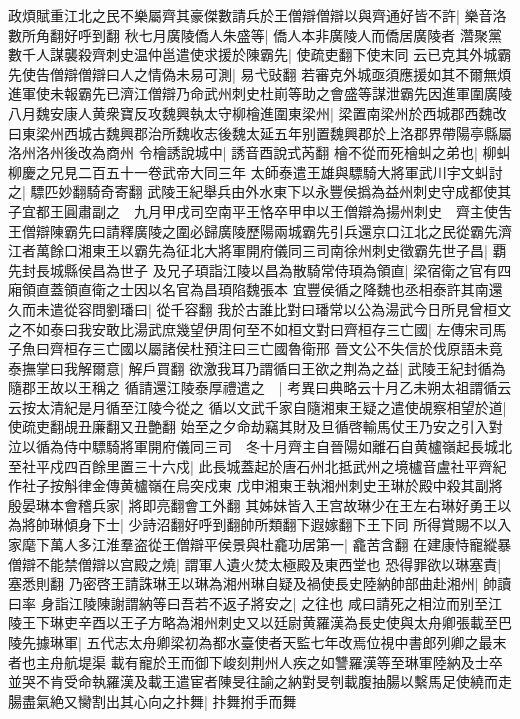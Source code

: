 政煩賦重江北之民不樂屬齊其豪傑數請兵於王僧辯僧辯以與齊通好皆不許|{
	樂音洛數所角翻好呼到翻}
秋七月廣陵僑人朱盛等|{
	僑人本非廣陵人而僑居廣陵者}
濳聚黨數千人謀襲殺齊刺史温仲邕遣使求援於陳霸先|{
	使疏吏翻下使末同}
云已克其外城霸先使告僧辯僧辯曰人之情偽未易可測|{
	易弋䜴翻}
若審克外城亟須應援如其不爾無煩進軍使未報霸先已濟江僧辯乃命武州刺史杜崱等助之會盛等謀泄霸先因進軍圍廣陵　八月魏安康人黄衆寶反攻魏興執太守柳檜進圍東梁州|{
	梁置南梁州於西城郡西魏改曰東梁州西城古魏興郡治所魏收志後魏太延五年别置魏興郡於上洛郡界帶陽亭縣屬洛州洛州後改為商州}
令檜誘說城中|{
	誘音酉說式芮翻}
檜不從而死檜虯之弟也|{
	柳虯柳慶之兄見二百五十一卷武帝大同三年}
太師泰遣王雄與驃騎大將軍武川宇文虯討之|{
	驃匹妙翻騎奇寄翻}
武陵王紀舉兵由外水東下以永豐侯撝為益州刺史守成都使其子宜都王圓肅副之　九月甲戌司空南平王恪卒甲申以王僧辯為揚州刺史　齊主使吿王僧辯陳霸先曰請釋廣陵之圍必歸廣陵歷陽兩城霸先引兵還京口江北之民從霸先濟江者萬餘口湘東王以霸先為征北大將軍開府儀同三司南徐州刺史徵霸先世子昌|{
	覇先封長城縣侯昌為世子}
及兄子頊詣江陵以昌為散騎常侍頊為領直|{
	梁宿衛之官有四廂領直蓋領直衛之士因以名官為昌頊陷魏張本}
宜豐侯循之降魏也丞相泰許其南還久而未遣從容問劉璠曰|{
	從千容翻}
我於古誰比對曰璠常以公為湯武今日所見曾桓文之不如泰曰我安敢比湯武庶幾望伊周何至不如桓文對曰齊桓存三亡國|{
	左傳宋司馬子魚曰齊桓存三亡國以屬諸侯杜預注曰三亡國魯衛邢}
晉文公不失信於伐原語未竟泰撫掌曰我解爾意|{
	解戶買翻}
欲激我耳乃謂循曰王欲之荆為之益|{
	武陵王紀封循為隨郡王故以王稱之}
循請還江陵泰厚禮遣之　|{
	考異曰典略云十月乙未朔太祖謂循云云按太清紀是月循至江陵今從之}
循以文武千家自隨湘東王疑之遣使覘察相望於道|{
	使疏吏翻覘丑廉翻又丑艶翻}
始至之夕命劫竊其財及旦循啓輸馬仗王乃安之引入對泣以循為侍中驃騎將軍開府儀同三司　冬十月齊主自晉陽如離石自黄櫨嶺起長城北至社平戍四百餘里置三十六戍|{
	此長城蓋起於唐石州北抵武州之境櫨音盧社平齊紀作社子按斛律金傳黄櫨嶺在烏突戍東}
戊申湘東王執湘州刺史王琳於殿中殺其副將殷晏琳本會稽兵家|{
	將即亮翻會工外翻}
其姊妹皆入王宫故琳少在王左右琳好勇王以為將帥琳傾身下士|{
	少詩沼翻好呼到翻帥所類翻下遐嫁翻下王下同}
所得賞賜不以入家麾下萬人多江淮羣盗從王僧辯平侯景與杜龕功居第一|{
	龕苦含翻}
在建康恃寵縱暴僧辯不能禁僧辯以宫殿之燒|{
	謂軍人遺火焚太極殿及東西堂也}
恐得罪欲以琳塞責|{
	塞悉則翻}
乃密啓王請誅琳王以琳為湘州琳自疑及禍使長史陸納帥部曲赴湘州|{
	帥讀曰率}
身詣江陵陳謝謂納等曰吾若不返子將安之|{
	之往也}
咸曰請死之相泣而别至江陵王下琳吏辛酉以王子方略為湘州刺史又以廷尉黄羅漢為長史使與太舟卿張載至巴陵先據琳軍|{
	五代志太舟卿梁初為都水臺使者天監七年改焉位視中書郎列卿之最末者也主舟航堤渠}
載有寵於王而御下峻刻荆州人疾之如讐羅漢等至琳軍陸納及士卒並哭不肯受命執羅漢及載王遣宦者陳旻往諭之納對旻刳載腹抽腸以繫馬足使繞而走腸盡氣絶又臠割出其心向之抃舞|{
	抃舞拊手而舞}
